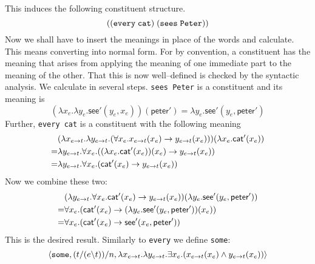 This induces the following constituent structure.
\begin{equation}
((\mbox{\tt every}\; \mbox{\tt cat})\;
(\mbox{\tt sees}\; \mbox{\tt Peter}))
\end{equation}
Now we shall have to insert the meanings in place of the words
and calculate. This means converting into normal form. For
by convention, a constituent has the meaning that arises from
applying the meaning of one immediate part to the meaning of the other.
That this is now well--defined is checked by the syntactic analysis.
We calculate in several steps.  {\tt sees Peter} is a constituent
and its meaning is
\begin{equation}
(\lambda x_e.\lambda y_e.\textsf{see}'(y_e, x_e))(%
\textsf{peter}') = \lambda y_e. \textsf{see}'(y_e, \textsf{peter}') 
\end{equation}
Further,  {\tt every cat} is a constituent with the following
meaning
\begin{align}
\begin{split}
  & (\lambda x_{e \rightarrow t}. \lambda y_{e \rightarrow t}.
    (\forall x_e. x_{e \rightarrow t}(x_e) \rightarrow y_{e \rightarrow t}(x_e)))
    (\lambda x_e.\textsf{cat}'(x_e)) \\
= &
    \lambda y_{e \rightarrow t}.\forall x_e.
    ((\lambda x_e. \textsf{cat}'(x_e))(x_e) \rightarrow
    y_{e \rightarrow t}(x_e)) \\
= &
    \lambda y_{e \rightarrow t}.\forall x_e.
    (\textsf{cat}'(x_e) \rightarrow y_{e \rightarrow t}(x_e))
    \end{split}
\end{align}
Now we combine these two:
\begin{align}
\begin{split}
 & (\lambda y_{e \pf t}.\forall x_e.
    \textsf{cat}'(x_e) \pf y_{e \pf t}(x_e))(%
    \lambda y_e. \textsf{see}'(y_e, \textsf{peter}')) \\
    = &
\forall x_e. (\textsf{cat}'(x_e) \pf
    (\lambda y_e. \textsf{see}'(y_e, \textsf{peter}'))(x_e)) \\
    = &
\forall x_e. (\textsf{cat}'(x_e) \pf
    \textsf{see}'(x_e, \textsf{peter}'))
\end{split}
\end{align}
This is the desired result. Similarly to {\tt every} we define
{\tt some}:
\begin{equation}
\langle \mbox{\tt some}, (t/(e \backslash t))/n, 
    \lambda x_{e \rightarrow t}. \lambda y_{e \rightarrow t}.
    \exists x_e. (x_{e \rightarrow t}(x_e) \wedge y_{e \rightarrow t}(x_e))\rangle
\end{equation}
